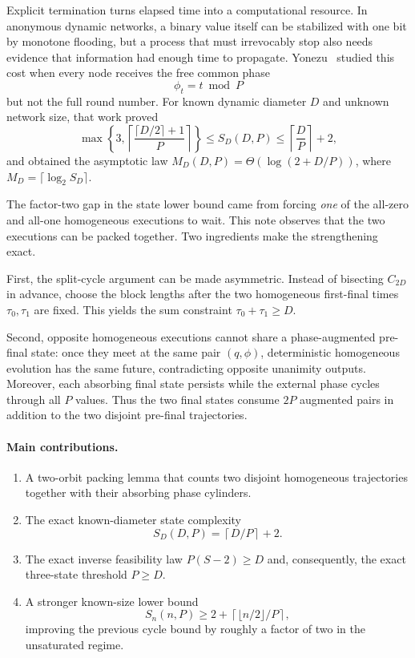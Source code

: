 \documentclass[11pt]{article}
\theoremstyle{remark}
\begin{document}
Explicit termination turns elapsed time into a computational resource.  In anonymous dynamic networks, a binary value itself can be stabilized with one bit by monotone flooding, but a process that must irrevocably stop also needs evidence that information had enough time to propagate.  Yonezu~\cite{yonezu2026statephase} studied this cost when every node receives the free common phase
\[
\phi_t=t\bmod P
\]
but not the full round number.  For known dynamic diameter $D$ and unknown network size, that work proved
\[
\max\!\left\{3,\left\lceil\frac{\lceil D/2\rceil+1}{P}\right\rceil\right\}
\le S_D(D,P)
\le \left\lceil\frac{D}{P}\right\rceil+2,
\]
and obtained the asymptotic law $M_D(D,P)=\Theta(\log(2+D/P))$, where $M_D=\lceil\log_2 S_D\rceil$.

The factor-two gap in the state lower bound came from forcing \emph{one} of the all-zero and all-one homogeneous executions to wait.  This note observes that the two executions can be packed together.  Two ingredients make the strengthening exact.

First, the split-cycle argument can be made asymmetric.  Instead of bisecting $C_{2D}$ in advance, choose the block lengths after the two homogeneous first-final times $\tau_0,\tau_1$ are fixed.  This yields the sum constraint $\tau_0+\tau_1\ge D$.

Second, opposite homogeneous executions cannot share a phase-augmented pre-final state: once they meet at the same pair $(q,\phi)$, deterministic homogeneous evolution has the same future, contradicting opposite unanimity outputs.  Moreover, each absorbing final state persists while the external phase cycles through all $P$ values.  Thus the two final states consume $2P$ augmented pairs in addition to the two disjoint pre-final trajectories.

\paragraph{Main contributions.}
\begin{enumerate}[leftmargin=1.5em]
\item A two-orbit packing lemma that counts two disjoint homogeneous trajectories together with their absorbing phase cylinders.
\item The exact known-diameter state complexity
\[
S_D(D,P)=\left\lceil D/P\right\rceil+2.
\]
\item The exact inverse feasibility law $P(S-2)\ge D$ and, consequently, the exact three-state threshold $P\ge D$.
\item A stronger known-size lower bound
\[
S_n(n,P)\ge 2+\left\lceil\lfloor n/2\rfloor/P\right\rceil,
\]
improving the previous cycle bound by roughly a factor of two in the unsaturated regime.
\end{enumerate}
\end{document}
